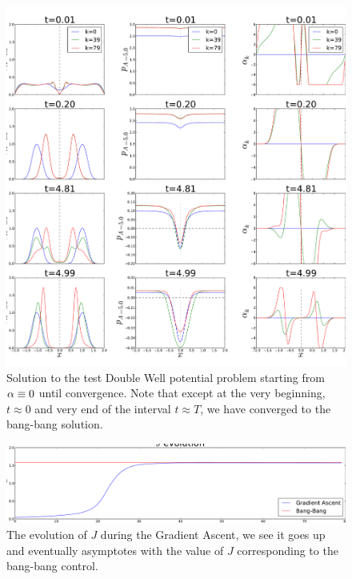\documentclass{article}
\begin{document}
\begin{figure}[htp]
\begin{center} 
  \includegraphics[width=.9\textwidth]{Figs/DoublewellFBSolver/FB_alpha_iterates_uICs_4.pdf}
  \caption[labelInTOC]{Solution to the test Double Well potential problem
  starting from ${\alpha} \equiv 0$ until convergence. Note that except at the very
  beginning, $t \approx 0$ and very end of the interval $t\approx T$, we have
  converged to the bang-bang solution. }
  \label{fig:FBSoln_doublewell_alpha_iterations}
\end{center}
\end{figure}

\begin{figure}[htp]
\begin{center}
  \includegraphics[width=.9\textwidth]{Figs/DoublewellFBSolver/FB_J_iterates_uICs.pdf}
  \caption[labelInTOC]{The evolution of $J$ during the Gradient Ascent, we see
  it goes up and eventually asymptotes with the value of $J$ corresponding to
  the bang-bang control. }
  \label{fig:FBSoln_doublewell_J_iterations}
\end{center}
\end{figure}
 
\end{document}
